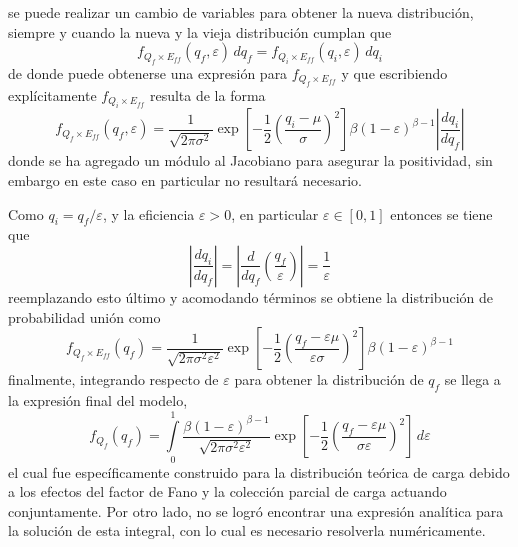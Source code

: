 se puede realizar un cambio de variables para obtener la nueva distribución, siempre y cuando la nueva y la vieja distribución cumplan que
\begin{equation*}
    f_{Q_{f}\times E_{ff}}(q_{f}, \varepsilon)\,dq_{f} =
    f_{Q_{i}\times E_{ff}}(q_{i}, \varepsilon)\,dq_{i}
\end{equation*}
de donde puede obtenerse una expresión para $f_{Q_{f}\times E_{ff}}$ y que escribiendo explícitamente $f_{Q_{i}\times E_{ff}}$ resulta de la forma
\begin{equation*}
    f_{Q_{f}\times E_{ff}}(q_{f}, \varepsilon)
    = 
    \frac{1}{\sqrt{2\pi \sigma^{2}}}
    \exp
        \left[
            -\frac{1}{2}
            \left(
                \frac{q_{i} - \mu}{\sigma}
            \right)^{2}
        \right]
    \beta(1-\varepsilon)^{\beta - 1}
    \left|
        \frac{dq_{i}}{dq_{f}}
    \right|
\end{equation*}
donde se ha agregado un módulo al Jacobiano para asegurar la positividad, sin embargo en este caso en particular no resultará necesario. 

Como $q_{i} = q_{f}/\varepsilon$, y la eficiencia $\varepsilon > 0$, en particular $\varepsilon \in [0, 1]$ entonces se tiene que 
\begin{equation*}
    \left|
        \frac{dq_{i}}{dq_{f}}
    \right|
        = 
    \left|
        \frac{d}{dq_{f}}
        \left(
            \frac{q_{f}}{\varepsilon}
        \right)
    \right|
        = 
        \frac{1}{\varepsilon}
\end{equation*}
reemplazando esto último y acomodando términos se obtiene la distribución de probabilidad unión como
\begin{equation*}
    f_{Q_{f}\times E_{ff}}(q_{f})
    = 
    \frac{1}{\sqrt{2\pi \sigma^{2}\varepsilon^{2}}}
    \exp
        \left[
            -\frac{1}{2}
            \left(
                \frac{q_{f} - \varepsilon\mu}{\varepsilon\sigma}
            \right)^{2}
        \right]
    \beta(1-\varepsilon)^{\beta - 1}
\end{equation*}
finalmente, integrando respecto de $\varepsilon$ para obtener la distribución de $q_{f}$ se llega a la expresión final del modelo,
\begin{equation}
    f_{Q_{f}}(q_{f}) = 
    \int\limits_{0}^{1}
    \frac{\beta(1-\varepsilon)^{\beta - 1}}{\sqrt{2\pi \sigma^{2}\varepsilon^{2}}}
    \exp
        \left[
            -\frac{1}{2}
            \left(
                \frac{q_{f} - \varepsilon\mu}{\sigma\varepsilon}
            \right)^{2}
        \right]\,
    d\varepsilon
    \label{ec:UnbinnedFit}
\end{equation}
el cual fue específicamente construido para la distribución teórica de carga debido a los efectos del factor de Fano y la colección parcial de carga actuando conjuntamente. Por otro lado, no se logró encontrar una expresión analítica para la solución de esta integral, con lo cual es necesario resolverla numéricamente.

